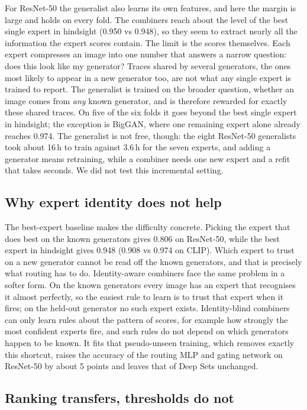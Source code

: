 \documentclass[10pt,a4paper]{article}
\begin{document}
For ResNet-50 the generalist also learns its own features, and here the margin is large and holds on every fold. The combiners reach about the level of the best single expert in hindsight (0.950 vs 0.948), so they seem to extract nearly all the information the expert scores contain. The limit is the scores themselves. Each expert compresses an image into one number that answers a narrow question: does this look like my generator? Traces shared by several generators, the ones most likely to appear in a new generator too, are not what any single expert is trained to report. The generalist is trained on the broader question, whether an image comes from \emph{any} known generator, and is therefore rewarded for exactly these shared traces. On five of the six folds it goes beyond the best single expert in hindsight; the exception is BigGAN, where one remaining expert alone already reaches 0.974. The generalist is not free, though: the eight ResNet-50 generalists took about 16\,h to train against 3.6\,h for the seven experts, and adding a generator means retraining, while a combiner needs one new expert and a refit that takes seconds. We did not test this incremental setting.

\subsection{Why expert identity does not help}\label{sec:disc-identity}

The best-expert baseline makes the difficulty concrete. Picking the expert that does best on the known generators gives 0.806 on ResNet-50, while the best expert in hindsight gives 0.948 (0.908 vs 0.974 on CLIP). Which expert to trust on a new generator cannot be read off the known generators, and that is precisely what routing has to do. Identity-aware combiners face the same problem in a softer form. On the known generators every image has an expert that recognises it almost perfectly, so the easiest rule to learn is to trust that expert when it fires; on the held-out generator no such expert exists. Identity-blind combiners can only learn rules about the pattern of scores, for example how strongly the most confident experts fire, and such rules do not depend on which generators happen to be known. It fits that pseudo-unseen training, which removes exactly this shortcut, raises the accuracy of the routing MLP and gating network on ResNet-50 by about 5 points and leaves that of Deep Sets unchanged.

\subsection{Ranking transfers, thresholds do not}\label{sec:disc-threshold}
\end{document}
